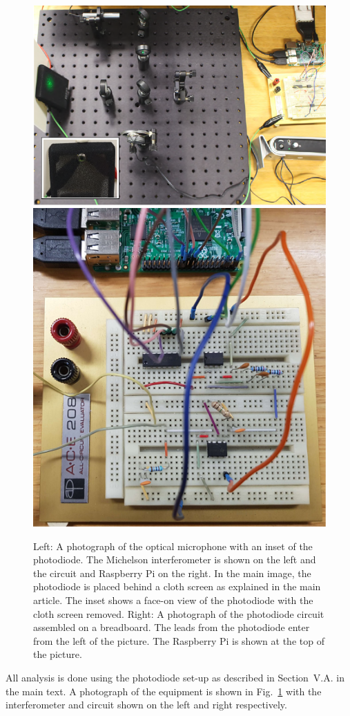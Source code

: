 \documentclass[aps,pra,superscriptaddress,reprint,nofootinbib]{revtex4-1}
\begin{document}
\begin{figure}
	\includegraphics[height=0.41\textwidth]{figures/setup_pic2.pdf}
	\includegraphics[height=0.41\textwidth]{figures/circuit_pic3.pdf}
	\caption{
Left: A photograph of the optical microphone with an inset of the photodiode. The Michelson interferometer is shown on the left and the circuit and Raspberry Pi on the right. In the main image, the photodiode is placed behind a cloth screen as explained in the main article. The inset shows a face-on view of the photodiode with the cloth screen removed. 
Right: A photograph of the photodiode circuit assembled on a breadboard. The leads from the photodiode enter from the left of the picture. The Raspberry Pi is shown at the top of the picture.
}
	\label{fig:photographs_of_optical_microphone_and_circuit}
\end{figure}


All analysis is done using the photodiode set-up as described in Section~V.A. in the main text. 
A photograph of the equipment is shown in Fig.~\ref{fig:photographs_of_optical_microphone_and_circuit} with the interferometer and circuit shown on the left and right respectively. 
\end{document}
